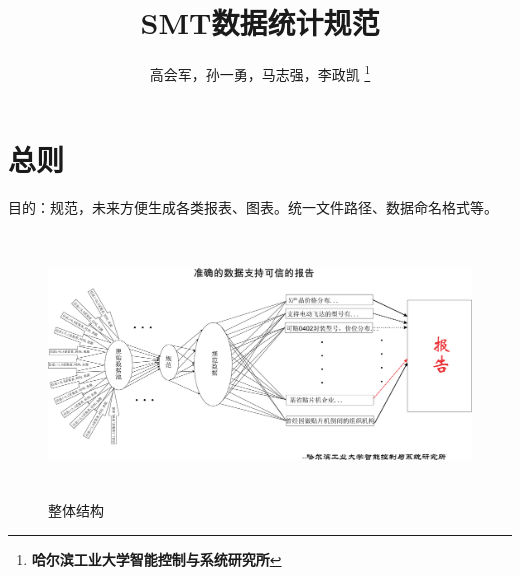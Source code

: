 \documentclass[a4paper,12pt]{article}
\begin{document}
\title{SMT数据统计规范}
\author{高会军，孙一勇，马志强，李政凯
\thanks{\textbf{哈尔滨工业大学智能控制与系统研究所}}
\date{\CurrentDate} %
}
\maketitle


\section{总则}
目的：规范，未来方便生成各类报表、图表。统一文件路径、数据命名格式等。

\begin{figure}%
\centering
\includegraphics[width=13.1cm,height=7cm]{SMT_Report_2017.03.10.eps}
\caption{整体结构}
\label{FigLabel_Section1_StructurePicture}
\end{figure}
\end{document}
